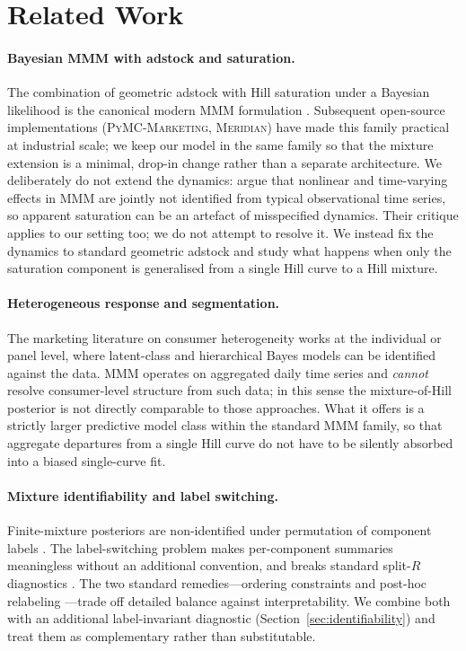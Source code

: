 \documentclass[11pt]{article}
\begin{document}
\section{Related Work}
\label{sec:related}

\paragraph{Bayesian MMM with adstock and saturation.} The combination of geometric adstock with Hill saturation under a Bayesian likelihood is the canonical modern MMM formulation \citep{jin2017bayesian, chan2017challenges}. Subsequent open-source implementations (\textsc{PyMC-Marketing}, \textsc{Meridian}) have made this family practical at industrial scale; we keep our model in the same family so that the mixture extension is a minimal, drop-in change rather than a separate architecture. We deliberately do not extend the dynamics: \citet{dew2024mmm} argue that nonlinear and time-varying effects in MMM are jointly not identified from typical observational time series, so apparent saturation can be an artefact of misspecified dynamics. Their critique applies to our setting too; we do not attempt to resolve it. We instead fix the dynamics to standard geometric adstock and study what happens when only the saturation component is generalised from a single Hill curve to a Hill mixture.

\paragraph{Heterogeneous response and segmentation.} The marketing literature on consumer heterogeneity \citep{wedel2000market, allenby1998marketing} works at the individual or panel level, where latent-class and hierarchical Bayes models can be identified against the data. MMM operates on aggregated daily time series and \emph{cannot} resolve consumer-level structure from such data; in this sense the mixture-of-Hill posterior is not directly comparable to those approaches. What it offers is a strictly larger predictive model class within the standard MMM family, so that aggregate departures from a single Hill curve do not have to be silently absorbed into a biased single-curve fit.

\paragraph{Mixture identifiability and label switching.} Finite-mixture posteriors are non-identified under permutation of component labels \citep{stephens2000label, fruhwirth2006finite}. The label-switching problem makes per-component summaries meaningless without an additional convention, and breaks standard split-$\widehat{R}$ diagnostics \citep{vehtari2021rhat}. The two standard remedies---ordering constraints and post-hoc relabeling \citep{papastamoulis2014label}---trade off detailed balance against interpretability. We combine both with an additional label-invariant diagnostic (Section~\ref{sec:identifiability}) and treat them as complementary rather than substitutable.
\end{document}
